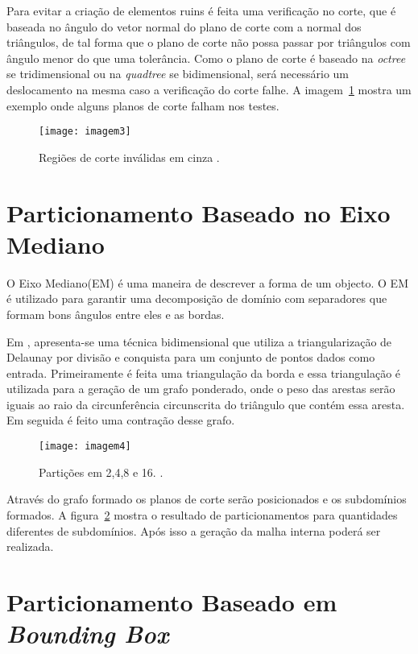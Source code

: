 Para evitar a criação de elementos ruins é feita uma verificação no corte, que é baseada no ângulo do vetor normal do plano de corte com a normal dos triângulos, de tal forma que o plano de corte não possa passar por triângulos com ângulo menor do que uma tolerância. Como o plano de corte é baseado na \textit{octree} se tridimensional ou na \textit{quadtree} se bidimensional, será necessário um deslocamento na mesma caso a verificação do corte falhe. A imagem~\ref{fig:imagem3} mostra um exemplo onde alguns planos de corte falham nos testes.

 \begin{figure}[htbp]
     \centering
     \texttt{[image: imagem3]}
     \caption{Regiões de corte inválidas em cinza \cite{bib:Larwood03}.}
     \label{fig:imagem3}
 \end{figure}

\section{Particionamento Baseado no Eixo Mediano}

O Eixo Mediano(EM) é uma maneira de descrever a forma de um objecto. O EM é utilizado para garantir uma decomposição de domínio com separadores que formam bons ângulos entre eles e as bordas. 

Em \cite{bib:Leonidas06}, apresenta-se uma técnica bidimensional que utiliza a triangularização de Delaunay por divisão e conquista para um conjunto de pontos dados como entrada. Primeiramente é feita uma triangulação da borda e essa triangulação é utilizada para a geração de um grafo ponderado, onde o peso das arestas serão iguais ao raio da circunferência circunscrita do triângulo que contém essa aresta. Em seguida é feito uma contração desse grafo. 

 \begin{figure}[htbp]
     \centering
     \texttt{[image: imagem4]}
     \caption{Partições em 2,4,8 e 16. \cite{bib:Leonidas06}.}
     \label{fig:imagem4}
 \end{figure}

Através do grafo formado os planos de corte serão posicionados e os subdomínios formados. A figura~\ref{fig:imagem4} mostra o resultado de particionamentos para quantidades diferentes de subdomínios. Após isso a geração da malha interna poderá ser realizada.

\section{Particionamento Baseado em \textit{Bounding Box}}

